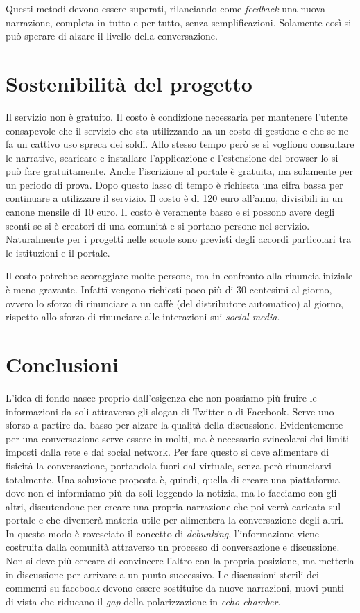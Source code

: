 \documentclass{article}
\begin{document}
Questi metodi devono essere superati, rilanciando come \textit{feedback} una nuova narrazione, completa in tutto e per tutto, senza semplificazioni. Solamente così si può sperare di alzare il livello della conversazione. 

\section{Sostenibilità del progetto}
\label{sec:sost-prog}

 Il servizio non è gratuito. Il costo è condizione necessaria per mantenere l’utente consapevole che il servizio che sta utilizzando ha un costo di gestione e che se ne fa un cattivo uso spreca dei soldi. Allo stesso tempo però se si vogliono consultare le narrative, scaricare e installare l’applicazione e l’estensione del browser lo si può fare gratuitamente. Anche l’iscrizione al portale è gratuita, ma solamente per un periodo di prova. Dopo questo lasso di tempo è richiesta una cifra bassa per continuare a utilizzare il servizio. Il costo è di 120 euro all’anno, divisibili in un canone mensile di 10 euro. Il costo è veramente basso e si possono avere degli sconti se si è creatori di una comunità e si portano persone nel servizio. Naturalmente per i progetti nelle scuole sono previsti degli accordi particolari tra le istituzioni e il portale.

Il costo potrebbe scoraggiare molte persone, ma in confronto alla rinuncia iniziale è meno gravante. Infatti vengono richiesti poco più di 30 centesimi al giorno, ovvero lo sforzo di rinunciare a un caffè (del distributore automatico) al giorno, rispetto allo sforzo di rinunciare alle interazioni sui \textit{social media}.

\section{Conclusioni}
\label{sec:concl}

L’idea di fondo nasce proprio dall’esigenza che non possiamo più fruire le informazioni da soli attraverso gli slogan di Twitter o di Facebook. Serve uno sforzo a partire dal basso per alzare la qualità della discussione. Evidentemente per una conversazione serve essere in molti, ma è necessario svincolarsi dai limiti imposti dalla rete e dai social network. Per fare questo si deve alimentare di fisicità la conversazione, portandola fuori dal virtuale, senza però rinunciarvi totalmente. Una soluzione proposta è, quindi, quella di creare una piattaforma dove non ci informiamo più da soli leggendo la notizia, ma lo facciamo con gli altri, discutendone per creare una propria narrazione che poi verrà caricata sul portale e che diventerà materia utile per alimentera la conversazione degli altri. In questo modo è rovesciato il concetto di \textit{debunking}, l’informazione viene costruita dalla comunità attraverso un processo di conversazione e discussione. Non si deve più cercare di convincere l’altro con la propria posizione, ma metterla in discussione per arrivare a un punto successivo. Le discussioni sterili dei commenti su facebook devono essere sostituite da nuove narrazioni, nuovi punti di vista che riducano il \textit{gap} della polarizzazione in \textit{echo chamber}.
\end{document}
